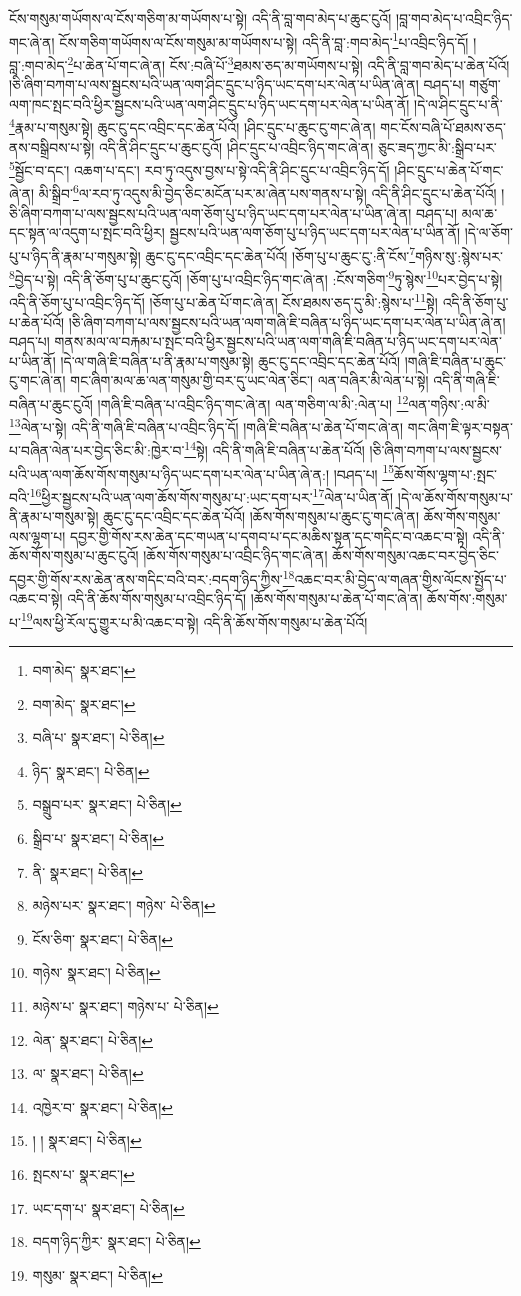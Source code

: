 ངོས་གསུམ་གཡོགས་ལ་ངོས་གཅིག་མ་གཡོགས་པ་སྟེ། འདི་ནི་བླ་གབ་མེད་པ་ཆུང་ངུའོ། །བླ་གབ་མེད་པ་འབྲིང་ཉིད་གང་ཞེ་ན། ངོས་གཅིག་གཡོགས་ལ་ངོས་གསུམ་མ་གཡོགས་པ་སྟེ། འདི་ནི་བླ་:གབ་མེད་\footnote{བག་མེད་  སྣར་ཐང་། }པ་འབྲིང་ཉིད་དོ། །བླ་:གབ་མེད་\footnote{བག་མེད་  སྣར་ཐང་། }པ་ཆེན་པོ་གང་ཞེ་ན། ངོས་:བཞི་པོ་\footnote{བཞི་པ་  སྣར་ཐང་།  པེ་ཅིན། }ཐམས་ཅད་མ་གཡོགས་པ་སྟེ། འདི་ནི་བླ་གབ་མེད་པ་ཆེན་པོའོ། །ཅི་ཞིག་བཀག་པ་ལས་སྦྱངས་པའི་ཡན་ལག་ཤིང་དྲུང་པ་ཉིད་ཡང་དག་པར་ལེན་པ་ཡིན་ཞེ་ན། བཤད་པ། གཙུག་ལག་ཁང་སྤང་བའི་ཕྱིར་སྦྱངས་པའི་ཡན་ལག་ཤིང་དྲུང་པ་ཉིད་ཡང་དག་པར་ལེན་པ་ཡིན་ནོ། །དེ་ལ་ཤིང་དྲུང་པ་ནི་\footnote{ཉིད་  སྣར་ཐང་།  པེ་ཅིན། }རྣམ་པ་གསུམ་སྟེ། ཆུང་ངུ་དང་འབྲིང་དང་ཆེན་པོའོ། །ཤིང་དྲུང་པ་ཆུང་ངུ་གང་ཞེ་ན། གང་ངོས་བཞི་པོ་ཐམས་ཅད་ནས་བསྒྲིབས་པ་སྟེ། འདི་ནི་ཤིང་དྲུང་པ་ཆུང་ངུའོ། །ཤིང་དྲུང་པ་འབྲིང་ཉིད་གང་ཞེ་ན། ཅུང་ཟད་ཀྱང་མི་:སྒྲིབ་པར་\footnote{བསྒྲུབ་པར་  སྣར་ཐང་།  པེ་ཅིན། }སྦྱོང་བ་དང་། འཆག་པ་དང་། རབ་ཏུ་འདུས་བྱས་པ་སྟེ་འདི་ནི་ཤིང་དྲུང་པ་འབྲིང་ཉིད་དོ། །ཤིང་དྲུང་པ་ཆེན་པོ་གང་ཞེ་ན། མི་སྒྲིབ་\footnote{སྒྲིབ་པ་  སྣར་ཐང་།  པེ་ཅིན། }ལ་རབ་ཏུ་འདུས་མི་བྱེད་ཅིང་མངོན་པར་མ་ཞེན་པས་གནས་པ་སྟེ། འདི་ནི་ཤིང་དྲུང་པ་ཆེན་པོའོ། །ཅི་ཞིག་བཀག་པ་ལས་སྦྱངས་པའི་ཡན་ལག་ཅོག་པུ་པ་ཉིད་ཡང་དག་པར་ལེན་པ་ཡིན་ཞེ་ན། བཤད་པ། མལ་ཆ་དང་སྟན་ལ་འདུག་པ་སྤང་བའི་ཕྱིར། སྦྱངས་པའི་ཡན་ལག་ཅོག་པུ་པ་ཉིད་ཡང་དག་པར་ལེན་པ་ཡིན་ནོ། །དེ་ལ་ཅོག་པུ་པ་ཉིད་ནི་རྣམ་པ་གསུམ་སྟེ། ཆུང་ངུ་དང་འབྲིང་དང་ཆེན་པོའོ། །ཅོག་པུ་པ་ཆུང་ངུ་:ནི་ངོས་\footnote{ནི་  སྣར་ཐང་།  པེ་ཅིན། }གཉིས་སུ་:སྙེས་པར་\footnote{མཉེས་པར་  སྣར་ཐང་། གཉེས་  པེ་ཅིན། }བྱེད་པ་སྟེ། འདི་ནི་ཅོག་པུ་པ་ཆུང་ངུའོ། །ཅོག་པུ་པ་འབྲིང་ཉིད་གང་ཞེ་ན། :ངོས་གཅིག་\footnote{ངོས་ཅིག་  སྣར་ཐང་།  པེ་ཅིན། }ཏུ་སྙེས་\footnote{གཉེས་  སྣར་ཐང་།  པེ་ཅིན། }པར་བྱེད་པ་སྟེ། འདི་ནི་ཅོག་པུ་པ་འབྲིང་ཉིད་དོ། །ཅོག་པུ་པ་ཆེན་པོ་གང་ཞེ་ན། ངོས་ཐམས་ཅད་དུ་མི་:སྙེས་པ་\footnote{མཉེས་པ་  སྣར་ཐང་། གཉེས་པ་  པེ་ཅིན། }སྟེ། འདི་ནི་ཅོག་པུ་པ་ཆེན་པོའོ། །ཅི་ཞིག་བཀག་པ་ལས་སྦྱངས་པའི་ཡན་ལག་གཞི་ཇི་བཞིན་པ་ཉིད་ཡང་དག་པར་ལེན་པ་ཡིན་ཞེ་ན། བཤད་པ། གནས་མལ་ལ་བརྐམ་པ་སྤང་བའི་ཕྱིར་སྦྱངས་པའི་ཡན་ལག་གཞི་ཇི་བཞིན་པ་ཉིད་ཡང་དག་པར་ལེན་པ་ཡིན་ནོ། །དེ་ལ་གཞི་ཇི་བཞིན་པ་ནི་རྣམ་པ་གསུམ་སྟེ། ཆུང་ངུ་དང་འབྲིང་དང་ཆེན་པོའོ། །གཞི་ཇི་བཞིན་པ་ཆུང་ངུ་གང་ཞེ་ན། གང་ཞིག་མལ་ཆ་ལན་གསུམ་གྱི་བར་དུ་ཡང་ལེན་ཅིང་། ལན་བཞིར་མི་ལེན་པ་སྟེ། འདི་ནི་གཞི་ཇི་བཞིན་པ་ཆུང་ངུའོ། །གཞི་ཇི་བཞིན་པ་འབྲིང་ཉིད་གང་ཞེ་ན། ལན་གཅིག་ལ་མི་:ལེན་པ། \footnote{ལེན་  སྣར་ཐང་།  པེ་ཅིན། }ལན་གཉིས་:ལ་མི་\footnote{ལ་  སྣར་ཐང་།  པེ་ཅིན། }ལེན་པ་སྟེ། འདི་ནི་གཞི་ཇི་བཞིན་པ་འབྲིང་ཉིད་དོ། །གཞི་ཇི་བཞིན་པ་ཆེན་པོ་གང་ཞེ་ན། གང་ཞིག་ཇི་ལྟར་བསྟན་པ་བཞིན་ལེན་པར་བྱེད་ཅིང་མི་:ཁྱེར་བ་\footnote{འཁྱེར་བ་  སྣར་ཐང་།  པེ་ཅིན། }སྟེ། འདི་ནི་གཞི་ཇི་བཞིན་པ་ཆེན་པོའོ། །ཅི་ཞིག་བཀག་པ་ལས་སྦྱངས་པའི་ཡན་ལག་ཆོས་གོས་གསུམ་པ་ཉིད་ཡང་དག་པར་ལེན་པ་ཡིན་ཞེ་ན:། །བཤད་པ། \footnote{། །   སྣར་ཐང་།  པེ་ཅིན། }ཆོས་གོས་ལྷག་པ་:སྤང་བའི་\footnote{སྤངས་པ་  སྣར་ཐང་། }ཕྱིར་སྦྱངས་པའི་ཡན་ལག་ཆོས་གོས་གསུམ་པ་:ཡང་དག་པར་\footnote{ཡང་དག་པ་  སྣར་ཐང་།  པེ་ཅིན། }ལེན་པ་ཡིན་ནོ། །དེ་ལ་ཆོས་གོས་གསུམ་པ་ནི་རྣམ་པ་གསུམ་སྟེ། ཆུང་ངུ་དང་འབྲིང་དང་ཆེན་པོའོ། །ཆོས་གོས་གསུམ་པ་ཆུང་ངུ་གང་ཞེ་ན། ཆོས་གོས་གསུམ་ལས་ལྷག་པ། དབྱར་གྱི་གོས་རས་ཆེན་དང་གཡན་པ་དགབ་པ་དང་མཆིས་སྟན་དང་གདིང་བ་འཆང་བ་སྟེ། འདི་ནི་ཆོས་གོས་གསུམ་པ་ཆུང་ངུའོ། །ཆོས་གོས་གསུམ་པ་འབྲིང་ཉིད་གང་ཞེ་ན། ཆོས་གོས་གསུམ་འཆང་བར་བྱེད་ཅིང་དབྱར་གྱི་གོས་རས་ཆེན་ནས་གདིང་བའི་བར་:བདག་ཉིད་ཀྱིས་\footnote{བདག་ཉིད་ཀྱིར་  སྣར་ཐང་།  པེ་ཅིན། }འཆང་བར་མི་བྱེད་ལ་གཞན་གྱིས་ལོངས་སྤྱོད་པ་འཆང་བ་སྟེ། འདི་ནི་ཆོས་གོས་གསུམ་པ་འབྲིང་ཉིད་དོ། །ཆོས་གོས་གསུམ་པ་ཆེན་པོ་གང་ཞེ་ན། ཆོས་གོས་:གསུམ་པ་\footnote{གསུམ་  སྣར་ཐང་།  པེ་ཅིན། }ལས་ཕྱི་རོལ་དུ་གྱུར་པ་མི་འཆང་བ་སྟེ། འདི་ནི་ཆོས་གོས་གསུམ་པ་ཆེན་པོའོ། 